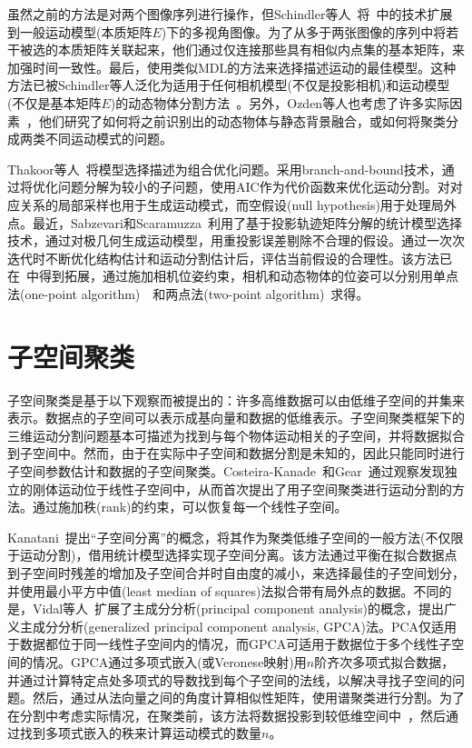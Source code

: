 虽然之前的方法是对两个图像序列进行操作，但Schindler等人~\cite{schindler2006perspective}将~\cite{schindler2005two}中的技术扩展到一般运动模型(本质矩阵$E$)下的多视角图像。为了从多于两张图像的序列中将若干被选的本质矩阵关联起来，他们通过仅连接那些具有相似内点集的基本矩阵，来加强时间一致性。最后，使用类似MDL的方法来选择描述运动的最佳模型。这种方法已被Schindler等人泛化为适用于任何相机模型(不仅是投影相机)和运动模型(不仅是基本矩阵$E$)的动态物体分割方法~\cite{schindler2008model}。另外，Ozden等人也考虑了许多实际因素~\cite{ozden2010multibody}，他们研究了如何将之前识别出的动态物体与静态背景融合，或如何将聚类分成两类不同运动模式的问题。

Thakoor等人~\cite{thakoor2010multibody}将模型选择描述为组合优化问题。采用branch-and-bound技术，通过将优化问题分解为较小的子问题，使用AIC作为代价函数来优化运动分割。对对应关系的局部采样也用于生成运动模式，而空假设(null hypothesis)用于处理局外点。最近，Sabzevari和Scaramuzza~\cite{sabzevari2014monocular}利用了基于投影轨迹矩阵分解的统计模型选择技术，通过对极几何生成运动模型，用重投影误差剔除不合理的假设。通过一次次迭代时不断优化结构估计和运动分割估计后，评估当前假设的合理性。该方法已在~\cite{sabzevari2016multiA}中得到拓展，通过施加相机位姿约束，相机和动态物体的位姿可以分别用单点法(one-point algorithm)~\cite{scaramuzza20111A}~\cite{scaramuzza2009realA}和两点法(two-point algorithm)~\cite{ortin2001indoor}求得。

\section{子空间聚类}
子空间聚类是基于以下观察而被提出的：许多高维数据可以由低维子空间的并集来表示。数据点的子空间可以表示成基向量和数据的低维表示。子空间聚类框架下的三维运动分割问题基本可描述为找到与每个物体运动相关的子空间，并将数据拟合到子空间中。然而，由于在实际中子空间和数据分割是未知的，因此只能同时进行子空间参数估计和数据的子空间聚类。Costeira-Kanade~\cite{costeira1998multibody}和Gear~\cite{gear1998multibody}通过观察发现独立的刚体运动位于线性子空间中，从而首次提出了用子空间聚类进行运动分割的方法。通过施加秩(rank)的约束，可以恢复每一个线性子空间。

Kanatani~\cite{kanatani2001motionA}提出“子空间分离”的概念，将其作为聚类低维子空间的一般方法(不仅限于运动分割)，借用统计模型选择实现子空间分离。该方法通过平衡在拟合数据点到子空间时残差的增加及子空间合并时自由度的减小，来选择最佳的子空间划分，并使用最小平方中值(least median of squares)法拟合带有局外点的数据。不同的是，Vidal等人~\cite{vidal2005generalized}扩展了主成分分析(principal component analysis)的概念，提出广义主成分分析(generalized principal component analysis, GPCA)法。PCA仅适用于数据都位于同一线性子空间内的情况，而GPCA可适用于数据位于多个线性子空间的情况。GPCA通过多项式嵌入(或Veronese映射)用$n$阶齐次多项式拟合数据，并通过计算特定点处多项式的导数找到每个子空间的法线，以解决寻找子空间的问题。然后，通过从法向量之间的角度计算相似性矩阵，使用谱聚类进行分割。为了在分割中考虑实际情况，在聚类前，该方法将数据投影到较低维空间中~\cite{vidal2005generalized}，然后通过找到多项式嵌入的秩来计算运动模式的数量$n$。

